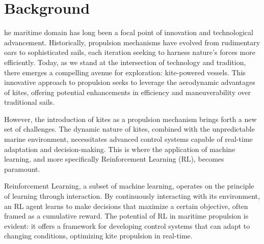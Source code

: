 %

%
\let\textcircled=\pgftextcircled
\chapter{Background}
\label{chap:background}





he maritime domain has long been a focal point of innovation and technological advancement. Historically, propulsion mechanisms have evolved from rudimentary oars to sophisticated sails, each iteration seeking to harness nature's forces more efficiently. Today, as we stand at the intersection of technology and tradition, there emerges a compelling avenue for exploration: kite-powered vessels. This innovative approach to propulsion seeks to leverage the aerodynamic advantages of kites, offering potential enhancements in efficiency and maneuverability over traditional sails.

However, the introduction of kites as a propulsion mechanism brings forth a new set of challenges. The dynamic nature of kites, combined with the unpredictable marine environment, necessitates advanced control systems capable of real-time adaptation and decision-making. This is where the application of machine learning, and more specifically Reinforcement Learning (RL), becomes paramount.

Reinforcement Learning, a subset of machine learning, operates on the principle of learning through interaction. By continuously interacting with its environment, an RL agent learns to make decisions that maximize a certain objective, often framed as a cumulative reward. The potential of RL in maritime propulsion is evident: it offers a framework for developing control systems that can adapt to changing conditions, optimizing kite propulsion in real-time.

